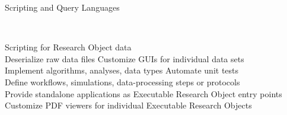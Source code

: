 \begin{frame}{}
{\begin{center}
\begin{minipage}{.97\textwidth}
{\begin{minipage}{\textwidth}
\begin{lightquadblock}{Scripting and Query Languages}
\begin{center}
\begin{minipage}{1.1\textwidth}
{\begin{itemize}
{} \\

\sqitem {\lsep} \parbox[t]{19cm}{Scripting for Research Object data\vspace{14pt}\\
{\vsps}\hspace*{5pt}{\MyOct}\hspace{-4pt} Deserialize raw data files  {\rMyOct}\hspace{-2pt} Customize GUIs for individual data sets \\
{\vsps}\hspace*{5pt}{\MyOct}\hspace{-4pt} Implement algorithms, analyses, data types {\rMyOct}\hspace{-2pt} Automate unit tests \\%
{\vsps}\hspace*{5pt}{\MyOct}\hspace{-4pt} Define workflows, simulations, data-processing steps or protocols \\%
{\vsps}\hspace*{5pt}{\MyOct}\hspace{-4pt} Provide standalone applications as Executable Research Object entry points \\%
{\vsps}\hspace*{5pt}{\MyOct}\hspace{-4pt} Customize PDF viewers for individual Executable Research Objects \\%
} \\

\end{itemize}}\end{minipage}
\vspace{-1em}
\end{center}
\end{lightquadblock}
\end{minipage}}


\end{minipage}
\end{center}
}

\end{frame}

